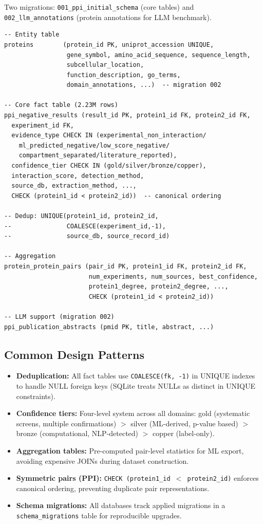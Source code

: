 Two migrations: \texttt{001\_ppi\_initial\_schema} (core tables) and \texttt{002\_llm\_annotations} (protein annotations for LLM benchmark).

\begin{small}
\begin{verbatim}
-- Entity table
proteins        (protein_id PK, uniprot_accession UNIQUE,
                 gene_symbol, amino_acid_sequence, sequence_length,
                 subcellular_location,
                 function_description, go_terms,
                 domain_annotations, ...)  -- migration 002

-- Core fact table (2.23M rows)
ppi_negative_results (result_id PK, protein1_id FK, protein2_id FK,
  experiment_id FK,
  evidence_type CHECK IN (experimental_non_interaction/
    ml_predicted_negative/low_score_negative/
    compartment_separated/literature_reported),
  confidence_tier CHECK IN (gold/silver/bronze/copper),
  interaction_score, detection_method,
  source_db, extraction_method, ...,
  CHECK (protein1_id < protein2_id))  -- canonical ordering

-- Dedup: UNIQUE(protein1_id, protein2_id,
--               COALESCE(experiment_id,-1),
--               source_db, source_record_id)

-- Aggregation
protein_protein_pairs (pair_id PK, protein1_id FK, protein2_id FK,
                       num_experiments, num_sources, best_confidence,
                       protein1_degree, protein2_degree, ...,
                       CHECK (protein1_id < protein2_id))

-- LLM support (migration 002)
ppi_publication_abstracts (pmid PK, title, abstract, ...)
\end{verbatim}
\end{small}

\subsection{Common Design Patterns}

\begin{itemize}[nosep,leftmargin=*]
    \item \textbf{Deduplication:} All fact tables use \texttt{COALESCE(fk, -1)} in UNIQUE indexes to handle NULL foreign keys (SQLite treats NULLs as distinct in UNIQUE constraints).
    \item \textbf{Confidence tiers:} Four-level system across all domains: gold (systematic screens, multiple confirmations) $>$ silver (ML-derived, p-value based) $>$ bronze (computational, NLP-detected) $>$ copper (label-only).
    \item \textbf{Aggregation tables:} Pre-computed pair-level statistics for ML export, avoiding expensive JOINs during dataset construction.
    \item \textbf{Symmetric pairs (PPI):} \texttt{CHECK (protein1\_id $<$ protein2\_id)} enforces canonical ordering, preventing duplicate pair representations.
    \item \textbf{Schema migrations:} All databases track applied migrations in a \texttt{schema\_migrations} table for reproducible upgrades.
\end{itemize}

